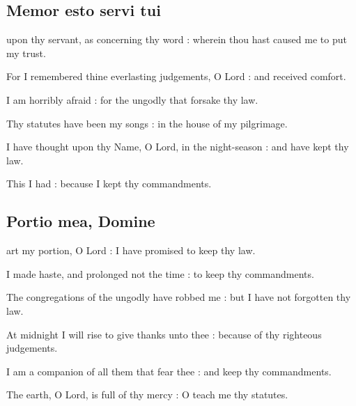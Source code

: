 \subsection{Memor esto servi tui}
 upon thy servant, as concerning thy word : wherein thou hast caused me to put my trust.\par
{}
For I remembered thine everlasting judgements, O Lord : and received comfort.\par
{}I am horribly afraid : for the ungodly that forsake thy law.\par
{}Thy statutes have been my songs : in the house of my pilgrimage.\par
{}I have thought upon thy Name, O Lord, in the night-season : and have kept thy law.\par
{}This I had : because I kept thy commandments.\par

\subsection{Portio mea, Domine}
 art my portion, O Lord : I have promised to keep thy law.\par
{}
I made haste, and prolonged not the time : to keep thy commandments.\par
{}The congregations of the ungodly have robbed me : but I have not forgotten thy law.\par
{}At midnight I will rise to give thanks unto thee : because of thy righteous judgements.\par
{}I am a companion of all them that fear thee : and keep thy commandments.\par
{}The earth, O Lord, is full of thy mercy : O teach me thy statutes.\par

